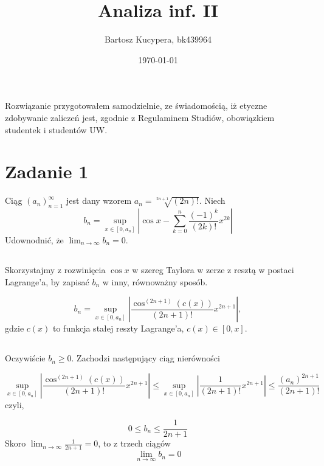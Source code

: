 \documentclass{article}
\title{Analiza inf. II}
\author{Bartosz Kucypera, bk439964}
\date{\today}
\begin{document}
\maketitle

Rozwiązanie przygotowałem samodzielnie, ze świadomością, iż etyczne zdobywanie zaliczeń jest, zgodnie z Regulaminem Studiów, obowiązkiem studentek i studentów UW.

\section*{Zadanie 1} 
Ciąg $(a_n)_{n=1}^{\infty}$ jest dany wzorem $a_n=\sqrt[2n+1]{(2n)!}$. Niech
$$b_n=\sup_{x\in[0,a_n]} \left| \cos{x}-\sum_{k=0}^{n}\frac{(-1)^k}{(2k)!}x^{2k} \right|$$
Udownodnić, że $\displaystyle \lim_{n\to \infty}b_n=0$.

\subsection*{}
Skorzystajmy z rozwinięcia $\cos{x}$ w szereg Taylora w zerze z resztą w postaci Lagrange’a, by zapisać $b_n$ w inny, równoważny sposób.

$$ b_n = \sup_{x\in[0,a_n]} \left| \frac{\cos^{(2n+1)}(c(x))}{(2n+1)!}x^{2n+1} \right|,$$
gdzie $c(x)$ to funkcja stałej reszty Lagrange'a, $c(x)\in[0,x]$.

\subsection*{}
Oczywiście $b_n \ge 0$. Zachodzi następujący ciąg nierówności

$$ \sup_{x\in[0,a_n]} \left| \frac{\cos^{(2n+1)}(c(x))}{(2n+1)!}x^{2n+1} \right| \le 
\sup_{x\in[0,a_n]} \left| \frac{1}{(2n+1)!}x^{2n+1} \right| \le 
\frac{(a_n)^{2n+1}}{(2n+1)!} $$
czyli,

$$ 0 \le b_n \le \frac{1}{2n+1} $$
Skoro $\displaystyle \lim_{n \to \infty} \frac{1}{2n+1} = 0$, to z trzech ciągów 
$$\lim_{n \to \infty} b_n = 0$$
\end{document}

